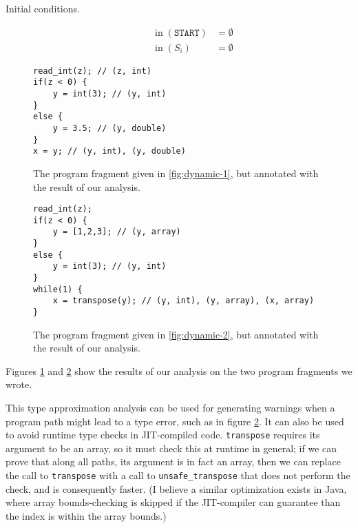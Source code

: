 \documentclass[11pt,letterpaper]{article}
\DeclareMathOperator{\inputOp}{in}
\newcommand{\In}[1]{\inputOp{(#1)}}
\begin{document}
\begin{description}
    \item[Initial conditions.]
        \begin{align*}
            \In{\mathtt{START}} &= \emptyset \\
            \In{S_i} &= \emptyset
        \end{align*}
\end{description}

\begin{figure}[ht]
    \centering
    \begin{lstlisting}
read_int(z); // (z, int)
if(z < 0) {
    y = int(3); // (y, int)
}
else {
    y = 3.5; // (y, double)
}
x = y; // (y, int), (y, double)
    \end{lstlisting}

    \caption{
        The program fragment given in \ref{fig:dynamic-1}, but annotated with
        the result of our analysis.
    }
    \label{fig:ann-dynamic-1}
\end{figure}

\begin{figure}[ht]
    \centering
    \begin{lstlisting}
read_int(z);
if(z < 0) {
    y = [1,2,3]; // (y, array)
}
else {
    y = int(3); // (y, int)
}
while(1) {
    x = transpose(y); // (y, int), (y, array), (x, array)
}
    \end{lstlisting}

    \caption{
        The program fragment given in \ref{fig:dynamic-2}, but annotated with
        the result of our analysis.
    }
    \label{fig:ann-dynamic-2}
\end{figure}

Figures \ref{fig:ann-dynamic-1} and \ref{fig:ann-dynamic-2} show the results of
our analysis on the two program fragments we wrote.

This type approximation analysis can be used for generating warnings when a
program path might lead to a type error, such as in figure
\ref{fig:ann-dynamic-2}. It can also be used to avoid runtime type checks in
JIT-compiled code. \texttt{transpose} requires its argument to be an array, so
it must check this at runtime in general; if we can prove that along all paths,
its argument is in fact an array, then we can replace the call to
\texttt{transpose} with a call to \texttt{unsafe\_transpose} that does not
perform the check, and is consequently faster. (I believe a similar
optimization exists in Java, where array bounds-checking is skipped if the
JIT-compiler can guarantee than the index is within the array bounds.)
\end{document}
